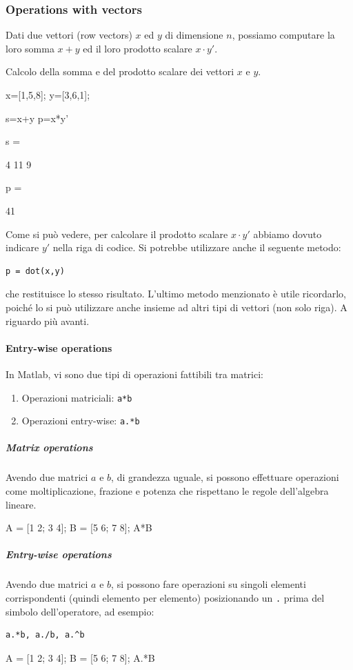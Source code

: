 \subsubsection{Operations with vectors}
Dati due vettori (row vectors) $ x $ ed $ y $ di dimensione $ n $, possiamo computare la loro
somma $ x+y $ ed il loro prodotto scalare $ x \cdot y' $.
\begin{example}
    Calcolo della somma e del prodotto scalare dei vettori $ x $ e $ y $.
\end{example}

\begin{matlab}
    x=[1,5,8];
    y=[3,6,1];

    s=x+y
    p=x*y'
\end{matlab}
\begin{matlabconsole}
    s =

    4    11     9


    p =

    41
\end{matlabconsole}
Come si può vedere, per calcolare il prodotto scalare $ x \cdot y' $ abbiamo dovuto indicare $ y' $
nella riga di codice. Si potrebbe utilizzare anche il seguente metodo:
\begin{verbatim}
p = dot(x,y)
\end{verbatim}
che restituisce lo stesso risultato. L'ultimo metodo menzionato è utile ricordarlo, poiché lo si può
utilizzare anche insieme ad altri tipi di vettori (non solo riga). A riguardo più avanti.

\paragraph{Entry-wise operations}
In Matlab, vi sono due tipi di operazioni fattibili tra matrici:
\begin{enumerate}
    \item Operazioni matriciali: \verb|a*b|
    \item Operazioni entry-wise: \verb|a.*b|
\end{enumerate}
\subparagraph{Matrix operations}
Avendo due matrici $ a $ e $ b $, di grandezza uguale, si possono effettuare operazioni
come moltiplicazione, frazione e potenza che rispettano le regole dell'algebra lineare.
\begin{matlab}
    A = [1 2; 3 4];
    B = [5 6; 7 8];
    A*B          %
\end{matlab}

\subparagraph{Entry-wise operations}
Avendo due matrici $ a $ e $ b $, si possono fare operazioni su singoli elementi corrispondenti (quindi
elemento per elemento) posizionando un \verb|.| prima del simbolo dell'operatore, ad esempio:
\begin{verbatim}
a.*b, a./b, a.^b
\end{verbatim}
\begin{matlab}
    A = [1 2; 3 4];
    B = [5 6; 7 8];
    A.*B          %
\end{matlab}

